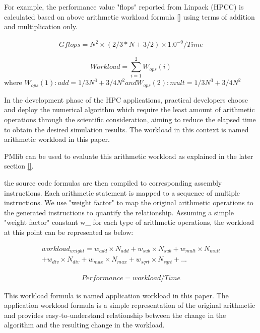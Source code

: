 \documentclass[conference]{IEEEtran}
\begin{document}
For example, the performance value "flops" reported from Linpack (HPCC)
\cite{}
is calculated based on above arithmetic workload formula
\ref{}
using terms of addition and multiplication only.

\begin{align*}
Gflops = N^{2} \times ( 2/3 * N + 3/2 ) \times 1.0^{-9} / Time 
\end{align*}

\begin{equation}
		Workload = \sum_{i=1}^{2} W_{ops}(i)
\end{equation}
where
\begin{math}
		W_{ops}(1) : add = 1/3 N^{3} + 3/4 N^{2}
		and
		W_{ops}(2) : mult = 1/3 N^{3} + 3/4 N^{2}
\end{math}

In the development phase of the HPC applications, practical developers
choose and deploy the numerical algorithm which require the least
amount of arithmetic operations through the scientific consideration,
aiming to reduce the elapsed time to obtain the desired simulation results.
The workload in this context is named arithmetic workload in this paper.

PMlib can be used to evaluate this arithmetic workload as explained
in the later section \ref{}.


the source code formulas are then compiled to corresponding assembly
instructions.
Each arithmetic statement is mapped to a sequence of multiple instructions.
We use "weight factor" to map the original arithmetic operations to the
generated instructions to quantify the relationship.
Assuming a simple "weight factor" constant w\_\* for each type of
arithmetic operations, 
the workload at this point can be represented as below:

\begin{align*}
workload_{weight} =
	w_{add}\times N_{add} + w_{sub}\times N_{sub} + w_{mult}\times N_{mult} \\
	+ w_{div}\times N_{div} + w_{max}\times N_{max} + w_{sqrt}\times N_{sqrt} + ...
\end{align*}

\begin{align*}
Performance = workload / Time 
\end{align*}

This workload formula is named application workload in this paper.
The application workload formula is a simple representation of the original
arithmetic and provides easy-to-understand relationship between the change
in the algorithm and the resulting change in the workload.
\end{document}
